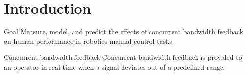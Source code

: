 \documentclass[10pt]{beamer}
\begin{document}
\section{Introduction}

{ %
    \begin{frame}[plain]
     \end{frame}
}

\begin{frame}[fragile]{Goal}
  Measure, model, and predict the effects of concurrent bandwidth feedback on human performance in robotics manual control tasks.
\end{frame}

\begin{frame}[fragile]{Concurrent bandwidth feedback}
  Concurrent bandwidth feedback is provided to an operator in real-time when a signal deviates out of a predefined range.
\end{frame}
\end{document}
